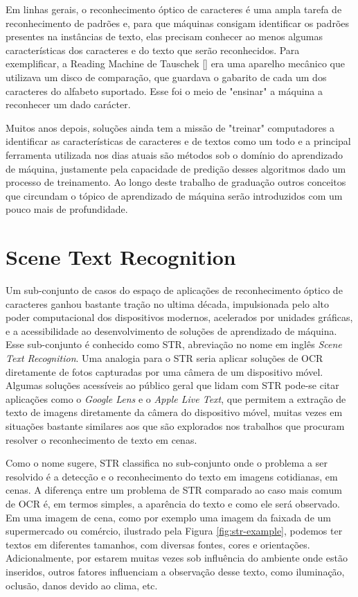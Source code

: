 Em linhas gerais, o reconhecimento óptico de caracteres é uma ampla tarefa de reconhecimento de padrões e, para que máquinas consigam identificar os padrões presentes na instâncias de texto, elas precisam conhecer ao menos algumas características dos caracteres e do texto que serão reconhecidos. Para exemplificar, a Reading Machine de Tauschek [] era uma aparelho mecânico que utilizava um disco de comparação, que guardava o gabarito de cada um dos caracteres do alfabeto suportado. Esse foi o meio de "ensinar" a máquina a reconhecer um dado carácter.

Muitos anos depois, soluções ainda tem a missão de "treinar" computadores a identificar as características de caracteres e de textos como um todo e a principal ferramenta utilizada nos dias atuais são métodos sob o domínio do aprendizado de máquina, justamente pela capacidade de predição desses algoritmos dado um processo de treinamento. Ao longo deste trabalho de graduação outros conceitos que circundam o tópico de aprendizado de máquina serão introduzidos com um pouco mais de profundidade.

\section{Scene Text Recognition}

Um sub-conjunto de casos do espaço de aplicações de reconhecimento óptico de caracteres ganhou bastante tração no ultima década, impulsionada pelo alto poder computacional dos dispositivos modernos, acelerados por unidades gráficas, e a acessibilidade ao desenvolvimento de soluções de aprendizado de máquina. Esse sub-conjunto é conhecido como STR, abreviação no nome em inglês \textit{Scene Text Recognition}. Uma analogia para o STR seria aplicar soluções de OCR diretamente de fotos capturadas por uma câmera de um dispositivo móvel. Algumas soluções acessíveis ao público geral que lidam com STR  pode-se citar aplicações como o \textit{Google Lens} e o \textit{Apple Live Text}, que permitem a extração de texto de imagens diretamente da câmera do dispositivo móvel, muitas vezes em situações bastante similares aos que são explorados nos trabalhos que procuram resolver o reconhecimento de texto em cenas.

Como o nome sugere, STR classifica no sub-conjunto onde o problema a ser resolvido é a detecção e o reconhecimento do texto em imagens cotidianas, em cenas. A diferença entre um problema de STR comparado ao caso mais comum de OCR é, em termos simples, a aparência do texto e como ele será observado. Em uma imagem de cena, como por exemplo uma imagem da faixada de um supermercado ou comércio, ilustrado pela Figura \ref{fig:str-example}, podemos ter textos em diferentes tamanhos, com diversas fontes, cores e orientações. Adicionalmente, por estarem muitas vezes sob influência do ambiente onde estão inseridos, outros fatores influenciam a observação desse texto, como iluminação, oclusão, danos devido ao clima, etc.

